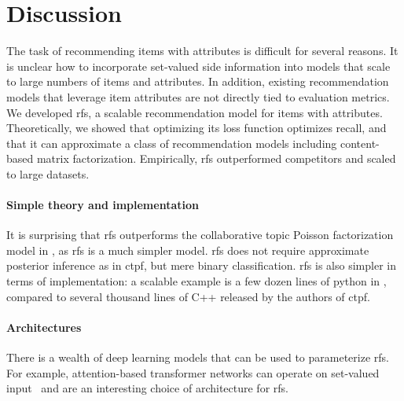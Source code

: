 \section{Discussion}

The task of recommending items with attributes is difficult for several reasons.
It is unclear how to incorporate set-valued side information into models that
scale to large numbers of items and attributes. In addition, existing
recommendation models that leverage item attributes are not directly tied to
evaluation metrics. We developed \acrlong{rfs}, a scalable recommendation model
for items with attributes. Theoretically, we showed that optimizing its loss
function optimizes recall, and that it can approximate a class of recommendation
models including content-based matrix factorization. Empirically, \gls{rfs}
outperformed competitors and scaled to large datasets.

\paragraph{Simple theory and implementation} It is surprising that \gls{rfs}
outperforms the collaborative topic Poisson factorization model in
\citet{gopalan2014content-based}, as \gls{rfs} is a much simpler model.
\gls{rfs} does not require approximate posterior inference as in \gls{ctpf}, but
mere binary classification. \gls{rfs} is also simpler in terms of
implementation: a scalable example is a few dozen lines of python in
, compared to several thousand lines of C++ released by the
authors of \gls{ctpf}.

\paragraph{Architectures} There is a wealth of deep learning models that can be
used to parameterize \gls{rfs}. For example, attention-based transformer
networks can operate on set-valued input~\cite{lee2018set-transformer} and are
an interesting choice of architecture for \gls{rfs}.

